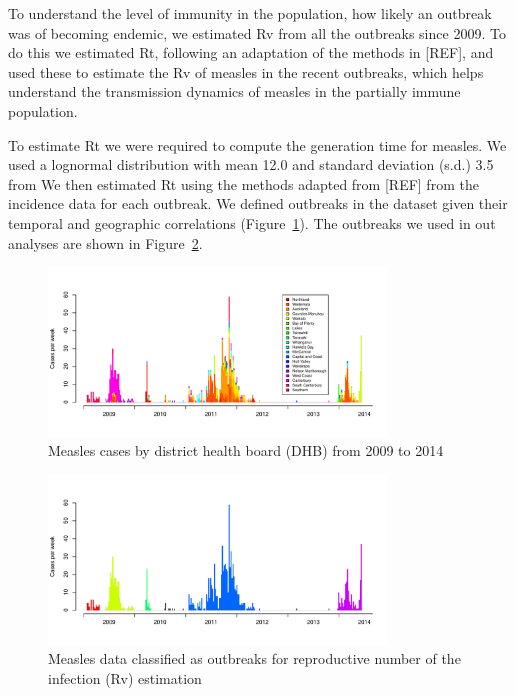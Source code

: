 \documentclass{article}
\begin{document}
To understand the level of immunity in the population, how likely an outbreak was of becoming endemic, we estimated Rv from all the outbreaks since 2009. To do this we estimated Rt, following an adaptation of the methods in [REF], and used these to estimate the Rv of measles in the recent outbreaks, which helps understand the transmission dynamics of measles in the partially immune population.

To estimate Rt we were required to compute the generation time for measles. We used a lognormal distribution with mean 12.0 and standard deviation (s.d.) 3.5 from %
We then estimated Rt using the methods adapted from [REF] from the incidence data for each outbreak. We defined outbreaks in the dataset given their temporal and geographic correlations (Figure~\ref{fig:dhbcases}). The outbreaks we used in out analyses are shown in Figure~\ref{fig:outbreaks}.

\begin{figure}
     \centering
     \includegraphics[width=0.8\textwidth]{cases_by_dhb_2009_2014.pdf}
     \caption{Measles cases by district health board (DHB) from 2009 to 2014}
     \label{fig:dhbcases}
\end{figure}

\begin{figure}
     \centering
     \includegraphics[width=0.8\textwidth]{outbreaks_for_R0.pdf}
     \caption{Measles data classified as outbreaks for reproductive number of the infection (Rv) estimation}
     \label{fig:outbreaks}
\end{figure}
\end{document}
